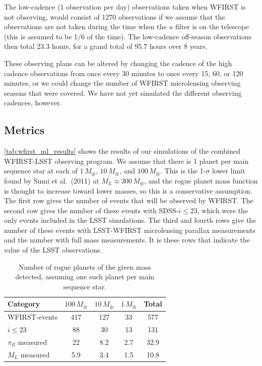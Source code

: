 The low-cadence (1 observation per day) observations taken when WFIRST
is not observing, would consist of 1270 observations if we assume that
the observations are not taken during the time when the $u$ filter is
on the telescope (this is assumed to be 1/6 of the time). The low-cadence
off-season observations then total 23.3 hours, for a grand total of
95.7 hours over 8 years.

These observing plans can be altered by changing the cadence of the high
cadence observations from once every 30 minutes to once every 15, 60,
or 120 minutes, or we could change the number of WFIRST microlensing
observing seasons that were covered. We have not yet simulated the
different observing cadences, however.


\subsection{Metrics}
\label{sec:\secname:metrics}

\autoref{tab:wfirst_ml_results}
shows the results of our simulations of the combined WFIRST-LSST
observing program. We assume that there is 1 planet per main sequence
star at each of $1\,M_\oplus$, $10\,M_\oplus$, and $100\,M_\oplus$.
This is the 1-$\sigma$ lower limit found by Sumi et al.\ (2011) at
$M_L \approx 300\,M_\oplus$, and the rogue planet mass function is
thought to increase toward lower masses, so this is a conservative
assumption. The first row gives the number of events that will be
observed by WFIRST. The second row gives the number of these events
with SDSS-$i \leq 23$, which were the only events included in the
LSST simulations. The third and fourth rows give the number of these events
with LSST-WFIRST microlensing parallax measurements and the number
with full mass measurements. It is these rows that indicate the
value of the LSST observations.

\begin{table}
\begin{tabular}{lcccc}
Category & $100\,M_\oplus$ & $10\,M_\oplus$ & $1\,M_\oplus$ & Total \\
\hline
WFIRST-events    &   417   &         127    &         33    &  577  \\
$i \leq 23$      &    88   &          30    &         13    &  131  \\
$\pi_E$ measured &    22   &           8.2  &          2.7  &   32.9 \\
$M_L$ measured   &    5.9  &           3.4  &          1.5  &   10.8 \\
\end{tabular}
\caption{Number of rogue planets of the given mass detected, assuming
one such planet per main sequence star.}
\label{tab:wfirst_ml_results}
\end{table}

